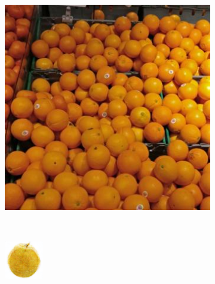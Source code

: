 \begin{figure}[t]
\begin{subfigure}[b]{0.18\textwidth}
		\caption{}
		\label{subfig:oatgurt-decoded}
	\end{subfigure} ~~~
	\begin{subfigure}[b]{0.18\textwidth}
		\centering
		\includegraphics[width=\textwidth]{PaperA/decoded-image-figure/Orange_056.jpg}
		\caption{}
		\label{subfig:orange-natural}
	\end{subfigure} ~
	\begin{subfigure}[b]{0.18\textwidth}
		\centering
		\includegraphics[width=\textwidth]{PaperA/decoded-image-figure/densenet_nov11/Orange_decoded.png}

\end{subfigure}
\end{figure}
